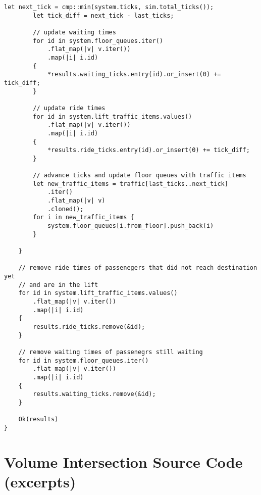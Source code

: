 \begin{lstlisting}[caption={Implementation of a single simulation run}, label={lst:app:simsinglerun}]
        let next_tick = cmp::min(system.ticks, sim.total_ticks());
        let tick_diff = next_tick - last_ticks;

        // update waiting times
        for id in system.floor_queues.iter()
            .flat_map(|v| v.iter())
            .map(|i| i.id)
        {
            *results.waiting_ticks.entry(id).or_insert(0) += tick_diff;
        }

        // update ride times
        for id in system.lift_traffic_items.values()
            .flat_map(|v| v.iter())
            .map(|i| i.id)
        {
            *results.ride_ticks.entry(id).or_insert(0) += tick_diff;
        }

        // advance ticks and update floor queues with traffic items
        let new_traffic_items = traffic[last_ticks..next_tick]
            .iter()
            .flat_map(|v| v)
            .cloned();
        for i in new_traffic_items {
            system.floor_queues[i.from_floor].push_back(i)
        }

    }

    // remove ride times of passenegers that did not reach destination yet
    // and are in the lift
    for id in system.lift_traffic_items.values()
        .flat_map(|v| v.iter())
        .map(|i| i.id)
    {
        results.ride_ticks.remove(&id);
    }

    // remove waiting times of passenegrs still waiting
    for id in system.floor_queues.iter()
        .flat_map(|v| v.iter())
        .map(|i| i.id)
    {
        results.waiting_ticks.remove(&id);
    }

    Ok(results)
}
\end{lstlisting}

\chapter{Volume Intersection Source Code (excerpts)}

